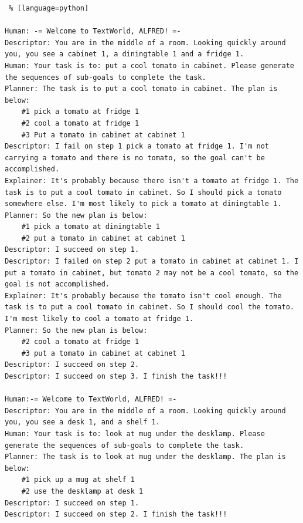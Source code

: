 \begin{lstlisting} % [language=python]  

Human: -= Welcome to TextWorld, ALFRED! =-
Descriptor: You are in the middle of a room. Looking quickly around you, you see a cabinet 1, a diningtable 1 and a fridge 1.
Human: Your task is to: put a cool tomato in cabinet. Please generate the sequences of sub-goals to complete the task.
Planner: The task is to put a cool tomato in cabinet. The plan is below:
    #1 pick a tomato at fridge 1
    #2 cool a tomato at fridge 1
    #3 Put a tomato in cabinet at cabinet 1
Descriptor: I fail on step 1 pick a tomato at fridge 1. I'm not carrying a tomato and there is no tomato, so the goal can't be accomplished.
Explainer: It's probably because there isn't a tomato at fridge 1. The task is to put a cool tomato in cabinet. So I should pick a tomato somewhere else. I'm most likely to pick a tomato at diningtable 1. 
Planner: So the new plan is below:
    #1 pick a tomato at diningtable 1
    #2 put a tomato in cabinet at cabinet 1
Descriptor: I succeed on step 1.
Descriptor: I failed on step 2 put a tomato in cabinet at cabinet 1. I put a tomato in cabinet, but tomato 2 may not be a cool tomato, so the goal is not accomplished.
Explainer: It's probably because the tomato isn't cool enough. The task is to put a cool tomato in cabinet. So I should cool the tomato. I'm most likely to cool a tomato at fridge 1. 
Planner: So the new plan is below:
    #2 cool a tomato at fridge 1
    #3 put a tomato in cabinet at cabinet 1
Descriptor: I succeed on step 2.
Descriptor: I succeed on step 3. I finish the task!!!

Human:-= Welcome to TextWorld, ALFRED! =-
Descriptor: You are in the middle of a room. Looking quickly around you, you see a desk 1, and a shelf 1.
Human: Your task is to: look at mug under the desklamp. Please generate the sequences of sub-goals to complete the task.
Planner: The task is to look at mug under the desklamp. The plan is below:
    #1 pick up a mug at shelf 1
    #2 use the desklamp at desk 1
Descriptor: I succeed on step 1.
Descriptor: I succeed on step 2. I finish the task!!!
\end{lstlisting}



